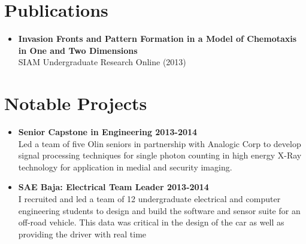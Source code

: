\documentclass{article}
\newcommand{\newitem}[2]{\item \textbf{ #1 \hfill #2}\\}
\begin{document}
\section*{Publications}
\begin{itemize}
\newitem{Invasion Fronts and Pattern Formation in a Model of Chemotaxis in One and Two Dimensions}{}
SIAM Undergraduate Research Online (2013)

\end{itemize}

\section*{Notable Projects}
\begin{itemize}
\newitem{Senior Capstone in Engineering}{2013-2014}
Led a team of five Olin seniors in partnership with Analogic Corp to develop signal processing techniques for single photon counting in high energy X-Ray technology for application in medial and security imaging.

\newitem{SAE Baja: Electrical Team Leader}{2013-2014}
I recruited and led a team of 12 undergraduate electrical and computer engineering students to design and build the software and sensor suite for an off-road vehicle. This data was critical in the design of the car as well as providing the driver with real time 
\end{itemize}
\end{document}
